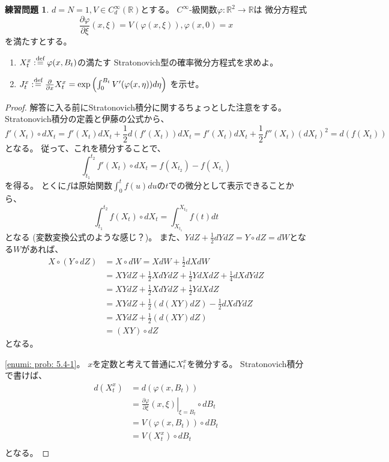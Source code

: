 \documentclass[uplatex]{jsarticle}
\theoremstyle{definition}
\newtheorem{prob}[prob]{練習問題}
\def\R{\mathbb{R}}
\def\dfn{:\overset{\mbox{{\scriptsize def}}}{=}}
\begin{document}
\begin{prob}\label{prob: 5.4}
  \(d=N=1, V\in C^\infty_d(\R)\)とする。
  \(C^\infty\)-級関数\(\varphi:\R^2 \to \R\)は
  微分方程式
  \[
  \frac{\partial \varphi}{\partial \xi}(x,\xi) = V(\varphi(x,\xi)) ,
  \varphi(x,0)=x
  \]
  を満たすとする。
  \begin{enumerate}
    \item \label{enumi: prob: 5.4-1}
    \(X_t^x \dfn \varphi(x,B_t)\)の満たす
    Stratonovich型の確率微分方程式を求めよ。
    \item \label{enumi: prob: 5.4-2}
    \(J_t^x \dfn \frac{\partial}{\partial x}X_t^x =
    \exp\left( \int_0^{B_t}V'(\varphi(x,\eta))d\eta \right)\)
    を示せ。
  \end{enumerate}
\end{prob}

\begin{proof}
  解答に入る前にStratonovich積分に関するちょっとした注意をする。
  Stratonovich積分の定義と伊藤の公式から、
  \[
  f'(X_t)\circ dX_t
  = f'(X_t)dX_t + \frac{1}{2}d\left( f'(X_t)\right) dX_t
  = f'(X_t)dX_t + \frac{1}{2}f''(X_t)(dX_t)^2
  = d\left( f(X_t) \right)
  \]
  となる。
  従って、これを積分することで、
  \[
  \int_{t_1}^{t_2}f'(X_t)\circ dX_t = f(X_{t_2}) - f(X_{t_1})
  \]
  を得る。
  とくに\(f\)は原始関数\(\int_0^t f(u)du\)の\(t\)での微分として表示できることから、
  \[
  \int_{t_1}^{t_2}f(X_t)\circ dX_t = \int_{X_{t_1}}^{X_{t_2}}f(t)dt
  \]
  となる (変数変換公式のような感じ？)。
  また、\(YdZ+\frac{1}{2}dYdZ = Y\circ dZ = dW\)となる\(W\)があれば、
  \begin{align*}
    X\circ (Y\circ dZ)
    &= X\circ dW = XdW + \frac{1}{2}dXdW \\
    &= XYdZ + \frac{1}{2}XdYdZ + \frac{1}{2}YdXdZ + \frac{1}{4}dXdYdZ \\
    &= XYdZ + \frac{1}{2}XdYdZ + \frac{1}{2}YdXdZ \\
    &= XYdZ + \frac{1}{2}(d(XY)dZ) - \frac{1}{2}dXdYdZ \\
    &= XYdZ + \frac{1}{2}(d(XY)dZ) \\
    &= (XY)\circ dZ
  \end{align*}
  となる。

  \ref{enumi: prob: 5.4-1}。
  \(x\)を定数と考えて普通に\(X_t^x\)を微分する。
  Stratonovich積分で書けば、
  \begin{align*}
    d(X_t^x)
    &= d\left( \varphi(x,B_t)\right) \\
    &= \left.\frac{\partial \varphi}{\partial\xi}
    (x,\xi)\right|_{\xi=B_t} \circ dB_t \\
    &= V(\varphi(x,B_t)) \circ dB_t \\
    &= V(X_t^x) \circ dB_t \\
  \end{align*}
  となる。


\end{proof}
\end{document}
